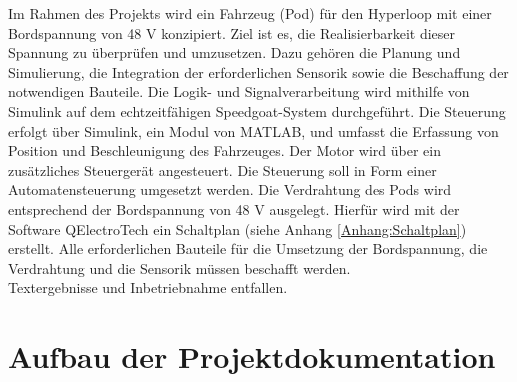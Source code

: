 Im Rahmen des Projekts wird ein Fahrzeug (Pod) für den Hyperloop mit einer Bordspannung von 48 V konzipiert. Ziel ist es, die Realisierbarkeit dieser Spannung zu überprüfen und umzusetzen. Dazu gehören die Planung und Simulierung, die Integration der erforderlichen Sensorik sowie die Beschaffung der notwendigen Bauteile. Die Logik- und Signalverarbeitung wird mithilfe von Simulink auf dem echtzeitfähigen Speedgoat-System durchgeführt.
Die Steuerung erfolgt über Simulink, ein Modul von MATLAB, und umfasst die Erfassung von Position und Beschleunigung des Fahrzeuges. Der Motor wird über ein zusätzliches Steuergerät angesteuert. Die Steuerung soll in Form einer Automatensteuerung umgesetzt werden.
Die Verdrahtung des Pods wird entsprechend der Bordspannung von 48 V ausgelegt. Hierfür wird mit der Software QElectroTech ein Schaltplan (siehe Anhang \ref{Anhang:Schaltplan}) erstellt.
Alle erforderlichen Bauteile für die Umsetzung der Bordspannung, die Verdrahtung und die Sensorik müssen beschafft werden.\\
Textergebnisse und Inbetriebnahme entfallen.



\section{Aufbau der Projektdokumentation}
\label{section:Aufbau}




